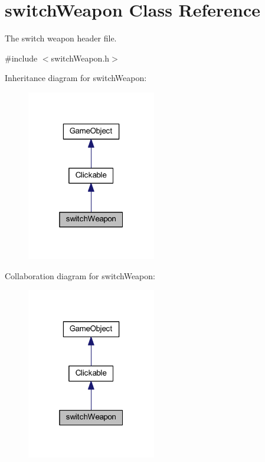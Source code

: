 \hypertarget{classswitch_weapon}{\section{switch\+Weapon Class Reference}
\label{classswitch_weapon}
}


The switch weapon header file.  




{\ttfamily \#include $<$switch\+Weapon.\+h$>$}



Inheritance diagram for switch\+Weapon\+:\nopagebreak
\begin{figure}[H]
\begin{center}
\leavevmode
\includegraphics[width=160pt]{classswitch_weapon__inherit__graph}
\end{center}
\end{figure}


Collaboration diagram for switch\+Weapon\+:\nopagebreak
\begin{figure}[H]
\begin{center}
\leavevmode
\includegraphics[width=160pt]{classswitch_weapon__coll__graph}
\end{center}
\end{figure}
